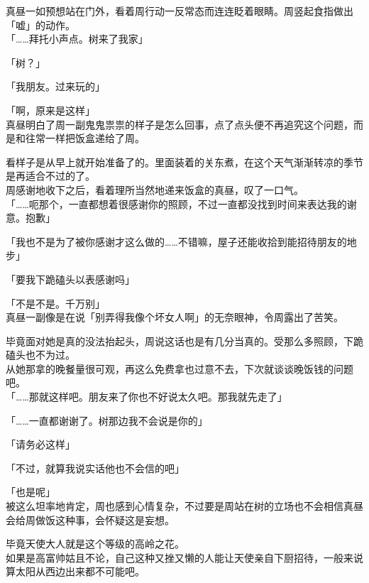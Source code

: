 真昼一如预想站在门外，看着周行动一反常态而连连眨着眼睛。周竖起食指做出「嘘」的动作。\\

「……拜托小声点。树来了我家」

「树？」

「我朋友。过来玩的」

「啊，原来是这样」\\

真昼明白了周一副鬼鬼祟祟的样子是怎么回事，点了点头便不再追究这个问题，而是和往常一样把饭盒递给了周。

看样子是从早上就开始准备了的。里面装着的关东煮，在这个天气渐渐转凉的季节是再适合不过的了。\\

周感谢地收下之后，看着理所当然地递来饭盒的真昼，叹了一口气。\\

「……呃那个，一直都想着很感谢你的照顾，不过一直都没找到时间来表达我的谢意。抱歉」

「我也不是为了被你感谢才这么做的……不错嘛，屋子还能收拾到能招待朋友的地步」

「要我下跪磕头以表感谢吗」

「不是不是。千万别」\\

真昼一副像是在说「别弄得我像个坏女人啊」的无奈眼神，令周露出了苦笑。

毕竟面对她是真的没法抬起头，周说这话也是有几分当真的。受那么多照顾，下跪磕头也不为过。\\

从她那拿的晚餐量很可观，再这么免费拿也过意不去，下次就谈谈晚饭钱的问题吧。\\

「……那就这样吧。朋友来了你也不好说太久吧。那我就先走了」

「……一直都谢谢了。树那边我不会说是你的」

「请务必这样」

「不过，就算我说实话他也不会信的吧」

「也是呢」\\

被这么坦率地肯定，周也感到心情复杂，不过要是周站在树的立场也不会相信真昼会给周做饭这种事，会怀疑这是妄想。

毕竟天使大人就是这个等级的高岭之花。\\

如果是高富帅姑且不论，自己这种又挫又懒的人能让天使亲自下厨招待，一般来说算太阳从西边出来都不可能吧。\\

